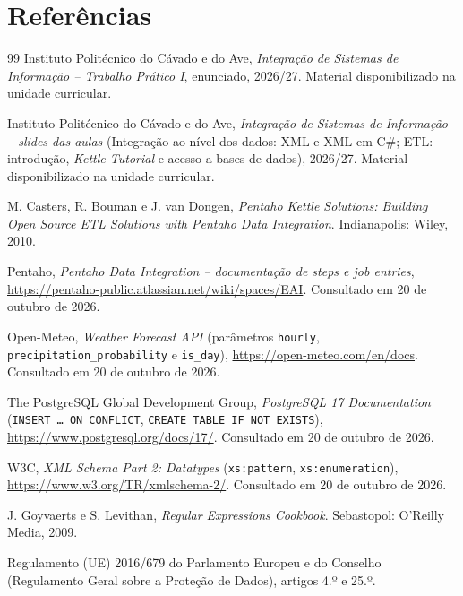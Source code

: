 \documentclass[11pt,a4paper]{article}
\begin{document}
\section{Referências}
\begingroup
\renewcommand{\section}[2]{}
\begin{thebibliography}{99}
Instituto Politécnico do Cávado e do Ave, \emph{Integração de Sistemas de Informação -- Trabalho Prático I}, enunciado, 2026/27. Material disponibilizado na unidade curricular.

Instituto Politécnico do Cávado e do Ave, \emph{Integração de Sistemas de Informação -- slides das aulas} (Integração ao nível dos dados: XML e XML em C\#; ETL: introdução, \textit{Kettle Tutorial} e acesso a bases de dados), 2026/27. Material disponibilizado na unidade curricular.

M. Casters, R. Bouman e J. van Dongen, \emph{Pentaho Kettle Solutions: Building Open Source ETL Solutions with Pentaho Data Integration}. Indianapolis: Wiley, 2010.

Pentaho, \emph{Pentaho Data Integration -- documentação de \textit{steps} e \textit{job entries}}, \url{https://pentaho-public.atlassian.net/wiki/spaces/EAI}. Consultado em 20 de outubro de 2026.

Open-Meteo, \emph{Weather Forecast API} (parâmetros \texttt{hourly}, \texttt{precipitation\_probability} e \texttt{is\_day}), \url{https://open-meteo.com/en/docs}. Consultado em 20 de outubro de 2026.

The PostgreSQL Global Development Group, \emph{PostgreSQL 17 Documentation} (\texttt{INSERT \ldots{} ON CONFLICT}, \texttt{CREATE TABLE IF NOT EXISTS}), \url{https://www.postgresql.org/docs/17/}. Consultado em 20 de outubro de 2026.

W3C, \emph{XML Schema Part 2: Datatypes} (\texttt{xs:pattern}, \texttt{xs:enumeration}), \url{https://www.w3.org/TR/xmlschema-2/}. Consultado em 20 de outubro de 2026.

J. Goyvaerts e S. Levithan, \emph{Regular Expressions Cookbook}. Sebastopol: O'Reilly Media, 2009.

Regulamento (UE) 2016/679 do Parlamento Europeu e do Conselho (Regulamento Geral sobre a Proteção de Dados), artigos 4.º e 25.º.
\end{thebibliography}
\endgroup
\end{document}
